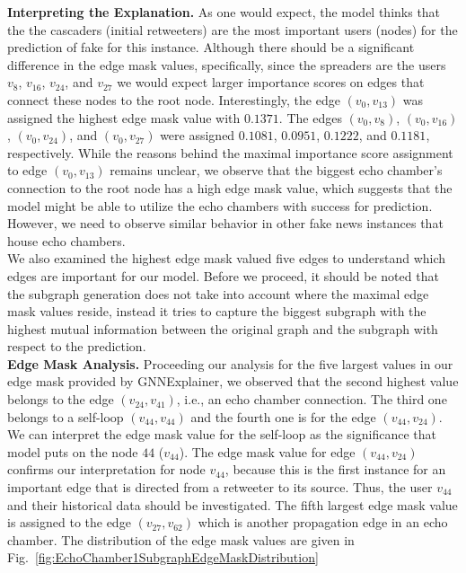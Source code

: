 \textbf{Interpreting the Explanation.} As one would expect, the model thinks that the the cascaders (initial retweeters) are the most important users (nodes) for the prediction of fake for this instance. Although there should be a significant difference in the edge mask values, specifically, since the spreaders are the users $v_8$, $v_{16}$, $v_{24}$, and $v_{27}$ we would expect larger importance scores on edges that connect these nodes to the root node. Interestingly, the edge $(v_0, v_{13})$ was assigned the highest edge mask value with $0.1371$. The edges $(v_0, v_8)$, $(v_0, v_{16})$, $(v_0, v_{24})$, and $(v_0, v_{27})$ were assigned $0.1081$, $0.0951$, $0.1222$, and $0.1181$, respectively.  While the reasons behind the maximal importance score assignment to edge $(v_0, v_{13})$ remains unclear, we observe that the biggest echo chamber's connection to the root node has a high edge mask value, which suggests that the model might be able to utilize the echo chambers with success for prediction. However, we need to observe similar behavior in other fake news instances that house echo chambers.\\
We also examined the highest edge mask valued five edges to understand which edges are important for our model. Before we proceed, it should be noted that the subgraph generation does not take into account where the maximal edge mask values reside, instead it tries to capture the biggest subgraph with the highest mutual information between the original graph and the subgraph with respect to the prediction.\\
\textbf{Edge Mask Analysis.} Proceeding our analysis for the five largest values in our edge mask provided by GNNExplainer, we observed that the second highest value belongs to the edge $(v_{24}, v_{41})$, i.e., an echo chamber connection. The third one belongs to a self-loop $(v_{44}, v_{44})$ and the fourth one is for the edge $(v_{44}, v_{24})$. We can interpret the edge mask value for the self-loop as the significance that model puts on the node $44$ ($v_{44}$). The edge mask value for edge $(v_{44}, v_{24})$ confirms our interpretation for node $v_{44}$, because this is the first instance for an important edge that is directed from a retweeter to its source. Thus, the user $v_{44}$ and their historical data should be investigated. The fifth largest edge mask value is assigned to the edge $(v_{27}, v_{62})$ which is another propagation edge in an echo chamber. The distribution of the edge mask values are given in Fig.~\ref{fig:EchoChamber1SubgraphEdgeMaskDistribution}\\
